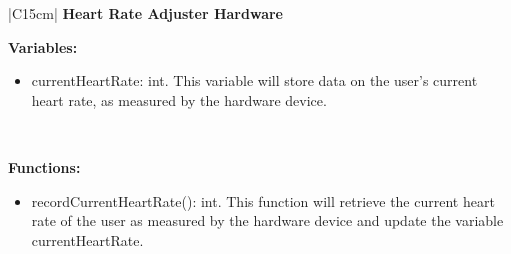 \begin{center}
	\begin{tabular}{|C{15cm}|}
		\hline
			\textbf{Heart Rate Adjuster Hardware} \\
		\hline
			\begin{flushleft}
				\textbf{Variables:} \\
			\end{flushleft}
				\begin{itemize}
					\item currentHeartRate: int. This variable will store data on the user's current heart rate, as measured by the hardware device.
				\end{itemize} \\
			\hline
			\begin{flushleft}
				\textbf{Functions: } \\
			\end{flushleft}
				\begin{itemize}
					\item recordCurrentHeartRate(): int. This function will retrieve the current heart rate of the user as measured by the hardware device and update the variable currentHeartRate.
				\end{itemize}\\
			\hline
	\end{tabular}
\end{center}
